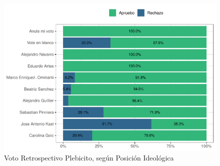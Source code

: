 \documentclass[
  12pt,
]{book}
\begin{document}
\begin{figure}

{\centering \includegraphics{reporte-elsoc_files/figure-latex/presi-voto-c44-1} 

}

\caption{Voto Retrospectivo Plebicito, según Posición Ideológica}\label{fig:presi-voto-c44}
\end{figure}
\end{document}
